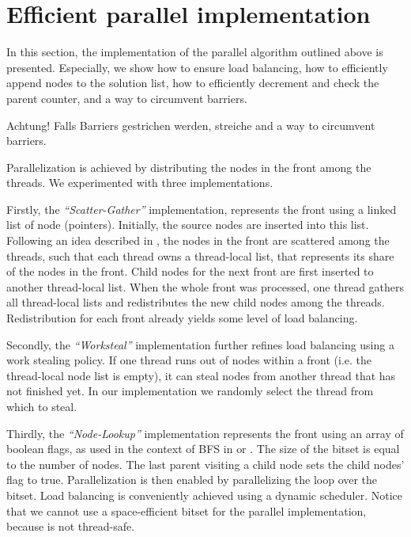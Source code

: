 \section{Efficient parallel implementation}\label{sec:yourmethod}
In this section, the implementation of the parallel algorithm outlined above is presented.
Especially, we show how to ensure load balancing, how to efficiently append nodes to the solution list, how to efficiently decrement and check the parent counter, and a way to circumvent barriers.
\begin{invisible}
 Achtung! Falls Barriers gestrichen werden, streiche and a way to circumvent barriers.
\end{invisible}

Parallelization is achieved by distributing the nodes in the front among the threads. We experimented with three implementations.

Firstly, the \emph{``Scatter-Gather''} implementation, represents the front using a linked list of node (pointers). Initially, the source nodes are inserted into this list.
Following an idea described in \cite{bulucc2011parallel}, the nodes in the front are scattered among the threads, such that each thread owns a thread-local list,
that represents its share of the nodes in the front.
Child nodes for the next front are first inserted to another thread-local list.
When the whole front was processed, one thread gathers all thread-local lists and redistributes the new child nodes among the threads.
Redistribution for each front already yields some level of load balancing.

Secondly, the \emph{``Worksteal''} implementation further refines load balancing using a work stealing policy.
If one thread runs out of nodes within a front (i.e. the thread-local node list is empty), it can steal nodes from another thread that has not finished yet. In our implementation we randomly select the thread from which to steal.

Thirdly, the \emph{``Node-Lookup''} implementation represents the front using an array of boolean flags, as used in the context of BFS in \cite{agarwal2010scalable} or \cite{beamer2013direction}. The size of the bitset is equal to the number of nodes.
The last parent visiting a child node sets the child nodes' flag to true. Parallelization is then enabled by parallelizing the loop over the bitset.
Load balancing is conveniently achieved using a dynamic scheduler.
Notice that we cannot use a space-efficient bitset for the parallel implementation, because is not thread-safe.

